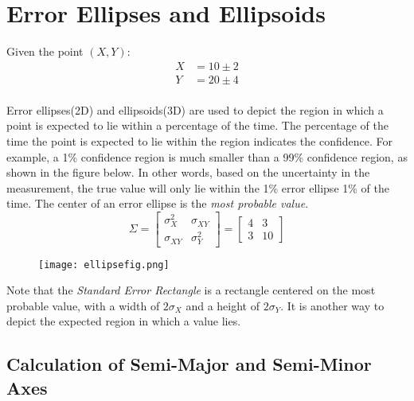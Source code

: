 \section{Error Ellipses and Ellipsoids}
Given the point $(X,Y)$:
\begin{align*}
X &= 10 \pm 2 \\
Y &= 20 \pm 4 \\
\end{align*}


Error ellipses(2D) and ellipsoids(3D) are used to depict the region in which a point is expected to lie within a percentage of the time.  The percentage of the time the point is expected to lie within the region indicates the confidence.  For example, a 1\% confidence region is much smaller than a 99\% confidence region, as shown in the figure below. In other words, based on the uncertainty in the measurement, the true value will only lie within the 1\% error ellipse 1\% of the time.  The center of an error ellipse is the \textit{most probable value}.
\[
\Sigma = 
\begin{bmatrix}
\sigma_X^2 & \sigma_{XY} \\
\sigma_{XY} & \sigma_Y^2 
\end{bmatrix}
=
\begin{bmatrix}
4 & 3 \\
3 & 10 
\end{bmatrix}
\]
\begin{figure}[H]
	\centering
	\texttt{[image: ellipsefig.png]}
\end{figure}

Note that the \textit{Standard Error Rectangle} is a rectangle centered on the most probable value, with a width of $2\sigma_X$ and a height of $2\sigma_Y$.  It is another way to depict the expected region in which a value lies.  

\subsection{Calculation of Semi-Major and Semi-Minor Axes}
